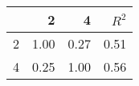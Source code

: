\begin{tabular}{lrrr}
\toprule
{} &     2 &     4 &  $R^2$ \\
\midrule
2 &  1.00 &  0.27 &   0.51 \\
4 &  0.25 &  1.00 &   0.56 \\
\bottomrule
\end{tabular}
